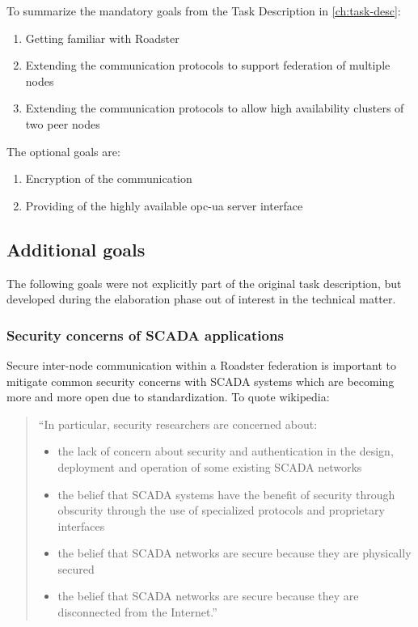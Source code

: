 To summarize the mandatory goals from the Task Description in \autoref{ch:task-desc}:

\begin{enumerate}
	\item Getting familiar with Roadster
	\item Extending the communication protocols to support federation of
		multiple nodes
	\item Extending the communication protocols to allow high availability
		clusters of two peer nodes
\end{enumerate}

The optional goals are:

\begin{enumerate}
	\item Encryption of the communication
	\item Providing of the highly available \gls{opc-ua} server interface
\end{enumerate}

\subsection{Additional goals}
The following goals were not explicitly part of the original task description,
but developed during the elaboration phase out of interest in the technical
matter.

\subsubsection{Security concerns of SCADA applications}
Secure inter-node communication within a Roadster federation is important to
mitigate common security concerns with SCADA systems which are becoming more
and more open due to standardization. To quote \cite[Security issues]{wp:scada}
wikipedia:

\begin{quote}
``In particular, security researchers are concerned about:
	\begin{itemize}
		\item the lack of concern about security and authentication in
			the design, deployment and operation of some existing
			SCADA networks
		\item the belief that SCADA systems have the benefit of
			security through obscurity through the use of
			specialized protocols and proprietary interfaces
		\item the belief that SCADA networks are secure because they
			are physically secured
		\item the belief that SCADA networks are secure because they
			are disconnected from the Internet.''
	\end{itemize}
\end{quote}

